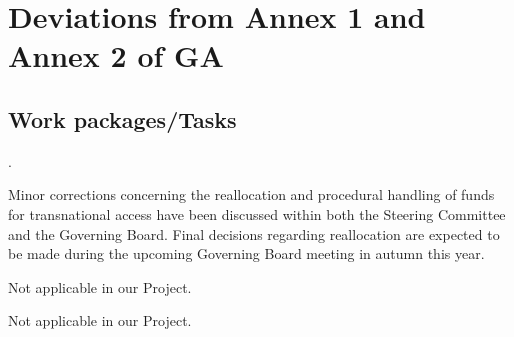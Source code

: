 
\clearpage
\section{Deviations from Annex 1 and Annex 2 of GA}
\label{sec:deviations}


\subsection{Work packages/Tasks}


.

Minor corrections concerning the reallocation and procedural handling of funds for transnational access have been discussed within both the Steering Committee and the Governing Board. Final decisions regarding reallocation are expected to be made during the upcoming Governing Board meeting in autumn this year.







Not applicable in our Project. 


Not applicable in our Project. 



